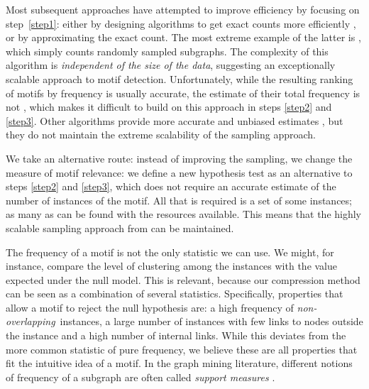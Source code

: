 \documentclass[twoside,11pt]{article}
\begin{document}
Most subsequent approaches have attempted to improve efficiency by focusing on step~\ref{step1}: either by designing algorithms to get exact counts more efficiently \citep{koskas2011nemo,li2012netmode,khakabimamaghani2013quatexelero,meira2014acc}, or by approximating the exact count. The most extreme example of the latter is \citet{kashtan2004efficient}, which simply counts randomly sampled subgraphs. The complexity of this algorithm is \emph{independent of the size of the data}, suggesting an exceptionally scalable approach to motif detection. Unfortunately, while the resulting ranking of motifs by frequency is usually accurate, the estimate of their total frequency is not \citep{wernicke2005faster}, which makes it difficult to build on this approach in steps \ref{step2} and \ref{step3}. Other algorithms provide more accurate and unbiased estimates \citep{wernicke2005faster,ribeiro2010g,bhuiyan2012guise,jha2015path,slota2014complex,paredes2015rand}, but they do not maintain the extreme scalability of the sampling approach.

We take an alternative route: instead of improving the sampling, we change the measure of motif relevance: we define a new hypothesis test as an alternative to steps \ref{step2} and \ref{step3}, which does not require an accurate estimate of the number of instances of the motif. All that is required is a set of some instances; as many as can be found with the resources available. This means that the highly scalable sampling approach from \cite{kashtan2004efficient} can be maintained.

The frequency of a motif is not the only statistic we can use. We might, for instance, compare the level of clustering among the instances with the value expected under the null model. This is relevant, because our compression method can be seen as a combination of several statistics. Specifically, properties that allow a motif to reject the null hypothesis are: a high frequency of \emph{non-overlapping}\footnotemark~instances, a large number of instances with few links to nodes outside the instance and a high number of internal links. While this deviates from the more common statistic of pure frequency, we believe these are all properties that fit the intuitive idea of a motif. In the graph mining literature, different notions of frequency of a subgraph are often called \emph{support measures} \citep{wang2012efficiently}. 

\end{document}
